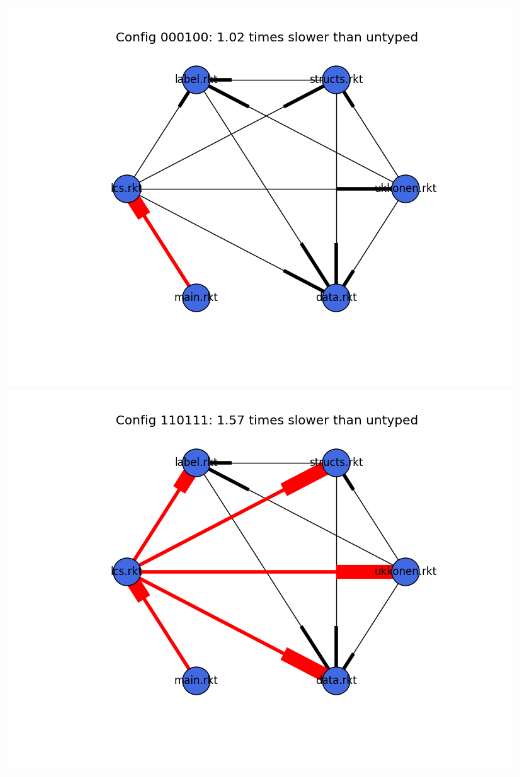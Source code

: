 \documentclass{article}
\begin{document}
\begin{itemize}
\includegraphics[width=\textwidth]{suffixtree-2015-04-02-module-graph-000100.png}
\includegraphics[width=\textwidth]{suffixtree-2015-04-02-module-graph-110111.png}
\end{itemize}
\end{document}
